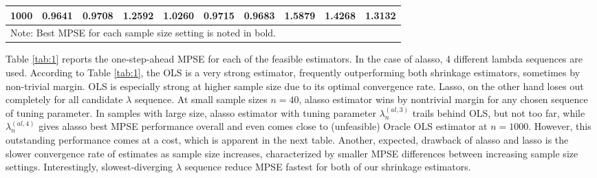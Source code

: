 \documentclass[12pt,a4paper]{article}
\begin{document}
\begin{table}[]
\begin{tabular}{cccccccccc}
\multicolumn{1}{|c|}{1000}                   & 0.9641                  & \multicolumn{1}{c|}{0.9708}               & 1.2592                  & 1.0260                  & 0.9715                  & \multicolumn{1}{c|}{\textbf{0.9683}}         & 1.5879                  & 1.4268                  & \multicolumn{1}{c|}{1.3132}                  \\ \hline
\multicolumn{10}{l}{Note: Best  MPSE for each sample size setting is noted in bold.}                                                                                                                                                                                                                                                              
\end{tabular}
\end{table}

Table \ref{tab:1} reports the one-step-ahead MPSE for each of the feasible estimators. In the case of alasso, 4 different lambda sequences are used. According to Table \ref{tab:1}, the OLS is a very strong estimator, frequently outperforming both shrinkage estimators, sometimes by non-trivial margin. OLS is especially strong at higher sample size due to its optimal convergence rate. Lasso, on the other hand loses out completely for all candidate $ 
\lambda $ sequence. At small sample sizes $ n = 40 $, alasso estimator wins by nontrivial margin for any chosen sequence of tuning parameter. In samples with large size, alasso estimator with tuning parameter $ \lambda_n^{(al, 3)} $ trails behind OLS, but not too far, while $ \lambda_n^{(al, 4)} $ gives alasso best MPSE performance overall and even comes close to (unfeasible) Oracle OLS estimator at $ n = 1000 $. However, this outstanding performance comes at a cost, which is apparent in the next table. Another, expected, drawback of alasso and lasso is the slower convergence rate of estimates as sample size increases, characterized by smaller MPSE differences between increasing sample size settings. Interestingly, slowest-diverging $ \lambda $ sequence reduce MPSE fastest for both of our shrinkage estimators.
\end{document}

